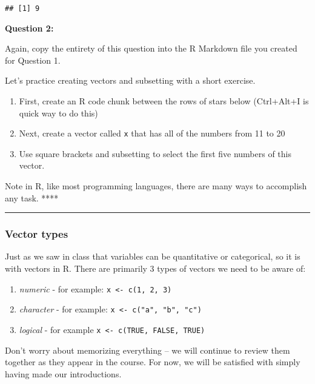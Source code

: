 \documentclass[
]{article}
\providecommand{\tightlist}{%
  \setlength{\itemsep}{0pt}\setlength{\parskip}{0pt}}
\begin{document}
\begin{verbatim}
## [1] 9
\end{verbatim}

\textbf{Question 2:}

Again, copy the entirety of this question into the R Markdown file you
created for Question 1.

Let's practice creating vectors and subsetting with a short exercise.

\begin{enumerate}
\def\labelenumi{\arabic{enumi}.}
\tightlist
\item
  First, create an R code chunk between the rows of stars below
  (Ctrl+Alt+I is quick way to do this)
\item
  Next, create a vector called \texttt{x} that has all of the numbers
  from 11 to 20
\item
  Use square brackets and subsetting to select the first five numbers of
  this vector.
\end{enumerate}

Note in R, like most programming languages, there are many ways to
accomplish any task. ****

\begin{center}\rule{0.5\linewidth}{0.5pt}\end{center}

\subsubsection{Vector types}\label{vector-types}

Just as we saw in class that variables can be quantitative or
categorical, so it is with vectors in R. There are primarily 3 types of
vectors we need to be aware of:

\begin{enumerate}
\def\labelenumi{\arabic{enumi}.}
\tightlist
\item
  \emph{numeric} - for example: \texttt{x\ \textless{}-\ c(1,\ 2,\ 3)}
\item
  \emph{character} - for example:
  \texttt{x\ \textless{}-\ c("a",\ "b",\ "c")}
\item
  \emph{logical} - for example
  \texttt{x\ \textless{}-\ c(TRUE,\ FALSE,\ TRUE)}
\end{enumerate}

Don't worry about memorizing everything -- we will continue to review
them together as they appear in the course. For now, we will be
satisfied with simply having made our introductions.
\end{document}
